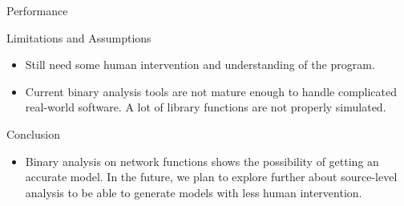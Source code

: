 \documentclass[final,hyperref={pdfpagelabels=false}]{beamer}
\begin{document}
\begin{frame}[t,fragile]
\begin{columns}[t]
\begin{column}{.47\textwidth}
\begin{block}{Performance}

\end{block}


\begin{block}{Limitations and Assumptions}

\begin{itemize}
\item Still need some human intervention and understanding of the program.
\item Current binary analysis tools are not mature enough to handle complicated
    real-world software. A lot of library functions are not properly simulated.
\end{itemize}

\end{block}


\begin{block}{Conclusion}

\begin{itemize}
    \item Binary analysis on network functions shows the possibility of getting
        an accurate model. In the future, we plan to explore further about
        source-level analysis to be able to generate models with less human
        intervention.
\end{itemize}

\end{block}


%
%


\end{column}
\end{columns}
\end{frame}
\end{document}
